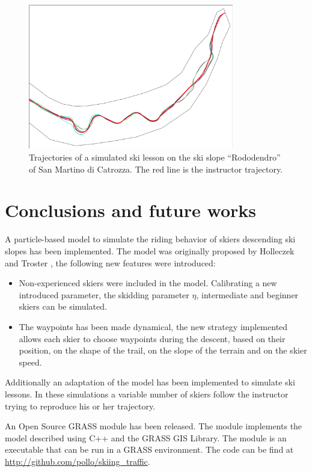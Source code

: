 \documentclass[12pt,a4paper,twoside]{book}
\begin{document}
\begin{figure}
  \centering
    \includegraphics[width=0.8\textwidth]{images/lesson.eps}
    \caption{Trajectories of a simulated ski lesson on the ski slope ``Rododendro'' of San Martino di Catrozza. The red line is the instructor trajectory.}\label{lesson}
\end{figure}

\chapter*{Conclusions and future works}
A particle-based model to simulate the riding behavior of skiers descending ski slopes has been implemented. The model was originally proposed by Holleczek and Troster \cite{hol2012}, the following new features were introduced:
\begin{itemize}
\item Non-experienced skiers were included in the model. Calibrating a new introduced parameter, the skidding parameter $\eta$, intermediate and beginner skiers can be simulated.
\item The waypoints has been made dynamical, the new strategy implemented allows each skier to choose waypoints during the descent, based on their position, on the shape of the trail, on the slope of the terrain and on the skier speed.
\end{itemize}
Additionally an adaptation of the model has been implemented to simulate ski lessons. In these simulations a variable number of skiers follow the instructor trying to reproduce his or her trajectory.

An Open Source GRASS module has been released. The module implements the model described using C++ and the GRASS GIS Library. The module is an executable that can be run in a GRASS environment. The code can be find at \url{http://github.com/pollo/skiing_traffic}.
\end{document}
